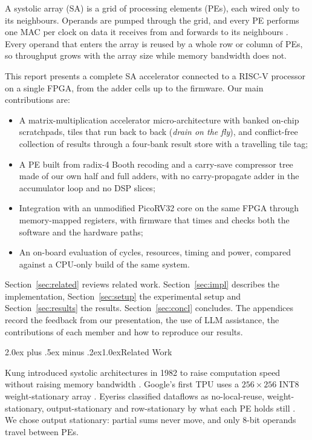\documentclass[10pt,twocolumn,a4paper]{article}
\makeatletter
\renewcommand\section{\@startsection{section}{1}{\z@}%
  {2.0ex plus .5ex minus .2ex}{1.0ex}{\centering\normalfont\scshape}}
\makeatother
\begin{document}
A systolic array (SA) is a grid of processing elements (PEs), each wired only
to its neighbours. Operands are pumped through the grid, and every PE performs
one MAC per clock on data it receives from and forwards to its neighbours
\cite{kung}. Every operand that enters the array is reused by a whole row or
column of PEs, so throughput grows with the array size while memory bandwidth
does not.

This report presents a complete SA accelerator connected to a RISC-V processor
on a single FPGA, from the adder cells up to the firmware. Our main
contributions are:
\begin{itemize}\setlength\itemsep{0pt}
\item A matrix-multiplication accelerator micro-architecture with banked
on-chip scratchpads, tiles that run back to back (\emph{drain on the fly}),
and conflict-free collection of results through a four-bank result store with
a travelling tile tag;
\item A PE built from radix-4 Booth recoding and a carry-save compressor tree
made of our own half and full adders, with no carry-propagate adder in the
accumulator loop and no DSP slices;
\item Integration with an unmodified PicoRV32 core on the same FPGA through
memory-mapped registers, with firmware that times and checks both the software
and the hardware paths;
\item An on-board evaluation of cycles, resources, timing and power, compared
against a CPU-only build of the same system.
\end{itemize}

Section~\ref{sec:related} reviews related work. Section~\ref{sec:impl}
describes the implementation, Section~\ref{sec:setup} the experimental setup
and Section~\ref{sec:results} the results. Section~\ref{sec:concl} concludes.
The appendices record the feedback from our presentation, the use of LLM
assistance, the contributions of each member and how to reproduce our results.

\section{Related Work}\label{sec:related}

Kung introduced systolic architectures in 1982 to raise computation speed
without raising memory bandwidth \cite{kung}. Google's first TPU uses a
$256\times256$ INT8 weight-stationary array \cite{tpu}. Eyeriss classified
dataflows as no-local-reuse, weight-stationary, output-stationary and
row-stationary by what each PE holds still \cite{eyeriss}. We chose output
stationary: partial sums never move, and only 8-bit operands travel between
PEs.
\end{document}
